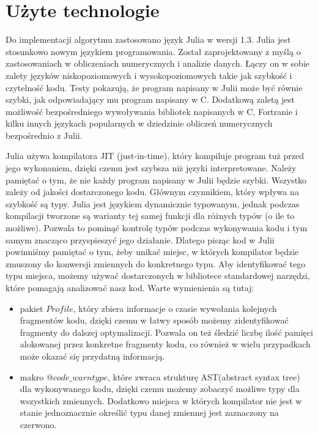 \section{Użyte technologie}
Do implementacji algorytmu zastosowano język Julia\cite{JULIA-PUB} w wersji 1.3. Julia jest stosunkowo nowym językiem programowania. Został zaprojektowany 
z myślą o zastosowaniach w obliczeniach numerycznych i analizie danych. Łączy on w sobie zalety języków niskopoziomowych i wysokopoziomowych takie jak szybkość 
i czytelność kodu. Testy pokazują, że program napisany w Julii może być równie szybki, jak odpowiadający mu program napisany w C\cite{JULIA-PERFORMANCE}. 
Dodatkową zaletą jest możliwość bezpośredniego wywoływania bibliotek napisanych w C, Fortranie i kilku innych językach popularnych w dziedzinie 
obliczeń numerycznych bezpośrednio z Julii.

Julia używa kompilatora JIT (just-in-time), który kompiluje program tuż przed jego wykonaniem, dzięki czemu jest szybsza 
niż języki interpretowane. Należy pamiętać o tym, że nie każdy program napisany w Julii będzie szybki. Wszystko zależy od jakości dostarczonego kodu.
Głównym czynnikiem, który wpływa na szybkość są typy. Julia jest językiem dynamicznie typowanym, jednak podczas kompilacji tworzone są warianty tej samej 
funkcji dla różnych typów (o ile to możliwe). Pozwala to pominąć kontrolę typów podczas wykonywania kodu i tym samym znacząco przyspieszyć jego działanie.
Dlatego pisząc kod w Julii powinniśmy pamiętać o tym, żeby unikać miejsc, w których kompilator będzie zmuszony do konwersji zmiennych do konkretnego typu. 
Aby identyfikować tego typu miejsca, możemy używać dostarczonych w bibliotece standardowej narzędzi, które pomagają analizować nasz kod. 
Warte wymienienia są tutaj:

\begin{itemize}
    \item pakiet $Profile$, który zbiera informacje o czasie wywołania kolejnych fragmentów kodu, dzięki czemu w łatwy sposób 
    możemy zidentyfikować fragmenty do dalszej optymalizacji. Pozwala on też śledzić liczbę ilość pamięci alokowanej przez konkretne fragmenty 
    kodu, co również w wielu przypadkach może okazać się przydatną informacją.
    \item makro $@code\_warntype$, które zwraca strukturę AST(abstract syntax tree) dla wykonywanego kodu, dzięki czemu możemy zobaczyć możliwe typy dla wszystkich zmiennych. 
    Dodatkowo miejsca w których kompilator nie jest w stanie jednoznacznie określić typu danej zmiennej jest zaznaczony na czerwono.
\end{itemize}

